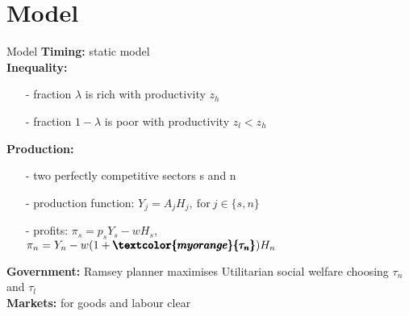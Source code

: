 \documentclass[11pt,aspectratio=169]{beamer}
\begin{document}
	\section{Model}
	
	
	\begin{frame}{Model}
		\textbf{Timing:} static model\\
		\vspace{1mm}
		\pause
		\textbf{Inequality:}
		\vspace{-2mm}
		\begin{itemize}
			\item[-] fraction $\lambda$ is rich with productivity $z_h$
			\item[-]  fraction $1-\lambda$ is poor with productivity $z_l<z_h$
		\end{itemize} 
	\pause
		\textbf{Production:}
		\vspace{-2mm}
		\begin{itemize}
			\item[-] two perfectly competitive sectors s and n 
			\item[-] production function: $Y_j=A_jH_j,\ \text{for} \ j\in\{s,n\}$
			\item[-] profits: $\pi_s=p_sY_s-wH_s$, \\ \hspace{12mm} $\pi_n=Y_n-w(1+\pmb{\textcolor{myorange}{\tau_n}})H_n$
		\end{itemize} 
	\pause
	\textbf{Government:} Ramsey planner maximises Utilitarian social welfare choosing $\tau_n$ and $\tau_l$\\
	\pause
	 		\vspace{1mm}
	\textbf{Markets:} for goods and labour clear
	\end{frame}
	
\end{document}
